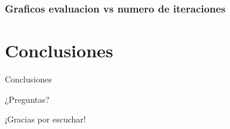 \documentclass[12pt,center]{beamer}
\begin{document}
\begin{frame}
  \frametitle{Graficos evaluacion vs numero de iteraciones}
\end{frame}

\section{Conclusiones}
\begin{frame}{Conclusiones}
\end{frame}



\begin{frame}
 {\Huge ¿Preguntas?}
\end{frame}

\begin{frame}
 {\Huge ¡Gracias por escuchar!}
\end{frame}



% 
% 
% 
% 

\begin{frame}
\begin{figure}[center]
\end{figure}
\end{frame}
\end{document}
